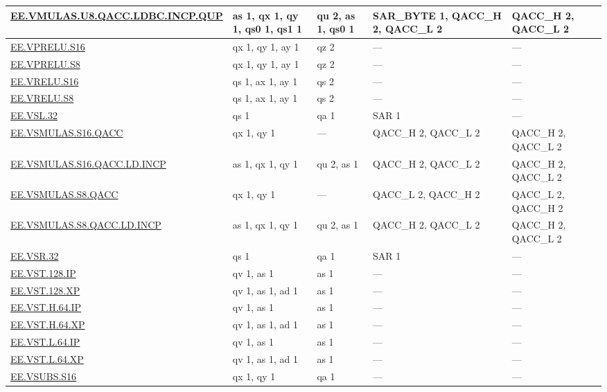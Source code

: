 \begin{longtable}[c]{|l|m{2.5cm}|m{2.5cm}|m{2.5cm}|m{2.5cm}|}
    \hyperref[instruction:EEVMULASU8QACCLDBCINCPQUP]{EE.VMULAS.U8.QACC.LDBC.INCP.QUP} & as 1, qx 1, qy 1, qs0 1, qs1 1 & qu 2, as 1, qs0 1 & SAR\_BYTE 1, QACC\_H 2, QACC\_L 2 & QACC\_H 2, QACC\_L 2\\\hline
    \hyperref[instruction:EEVPRELUS16]{EE.VPRELU.S16} & qx 1, qy 1, ay 1 & qz 2 & — & — \\\hline
    \hyperref[instruction:EEVPRELUS8]{EE.VPRELU.S8} & qx 1, qy 1, ay 1 & qz 2 & — & — \\\hline
    \hyperref[instruction:EEVRELUS16]{EE.VRELU.S16} & qs 1, ax 1, ay 1 & qs 2 & — & — \\\hline
    \hyperref[instruction:EEVRELUS8]{EE.VRELU.S8} & qs 1, ax 1, ay 1 & qs 2 & — & — \\\hline
    \hyperref[instruction:EEVSL32]{EE.VSL.32} & qs 1 & qa 1 & SAR 1 & — \\\hline
    \hyperref[instruction:EEVSMULASS16QACC]{EE.VSMULAS.S16.QACC} & qx 1, qy 1 & — & QACC\_H 2, QACC\_L 2 & QACC\_H 2, QACC\_L 2\\\hline
    \hyperref[instruction:EEVSMULASS16QACCLDINCP]{EE.VSMULAS.S16.QACC.LD.INCP} & as 1, qx 1, qy 1 & qu 2, as 1 & QACC\_H 2, QACC\_L 2 & QACC\_H 2, QACC\_L 2\\\hline
    \hyperref[instruction:EEVSMULASS8QACC]{EE.VSMULAS.S8.QACC} & qx 1, qy 1 & — & QACC\_L 2, QACC\_H 2 & QACC\_L 2, QACC\_H 2\\\hline
    \hyperref[instruction:EEVSMULASS8QACCLDINCP]{EE.VSMULAS.S8.QACC.LD.INCP} & as 1, qx 1, qy 1 & qu 2, as 1 & QACC\_H 2, QACC\_L 2 & QACC\_H 2, QACC\_L 2\\\hline
    \hyperref[instruction:EEVSR32]{EE.VSR.32} & qs 1 & qa 1 & SAR 1 & — \\\hline
    \hyperref[instruction:EEVST128IP]{EE.VST.128.IP} & qv 1, as 1 & as 1 & — & — \\\hline
    \hyperref[instruction:EEVST128XP]{EE.VST.128.XP} & qv 1, as 1, ad 1 & as 1 & — & — \\\hline
    \hyperref[instruction:EEVSTH64IP]{EE.VST.H.64.IP} & qv 1, as 1 & as 1 & — & — \\\hline
    \hyperref[instruction:EEVSTH64XP]{EE.VST.H.64.XP} & qv 1, as 1, ad 1 & as 1 & — & — \\\hline
    \hyperref[instruction:EEVSTL64IP]{EE.VST.L.64.IP} & qv 1, as 1 & as 1 & — & — \\\hline
    \hyperref[instruction:EEVSTL64XP]{EE.VST.L.64.XP} & qv 1, as 1, ad 1 & as 1 & — & — \\\hline
    \hyperref[instruction:EEVSUBSS16]{EE.VSUBS.S16} & qx 1, qy 1 & qa 1 & — & — \\\hline

\end{longtable}
